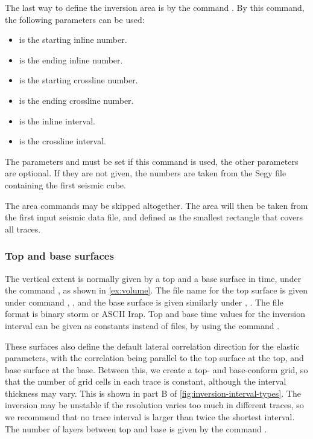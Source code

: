 The last way to define the inversion area is by the command . By this command, the following parameters can be used:
\begin{itemize}
\item {} is the starting inline number.
\item {} is the ending inline number.
\item {} is the starting crossline number.
\item {} is the ending crossline number.
\item {} is the inline interval.
\item {} is the crossline interval.
\end{itemize}
The parameters  and  must be set if this command is used, the other parameters are optional. If they are not given, the numbers are taken from the Segy file containing the first seismic cube.

The area commands may be skipped altogether. The area will then be taken from the first input seismic data file, and defined as the smallest rectangle that covers all traces.

\subsubsection{Top and base surfaces}
The vertical extent is normally given by a top and a base surface in
time, under the command 
, as shown in \autoref{ex:volume}. The
file name for the top surface is given under command
, , and the base
surface is given similarly under 
, . The file format is binary
storm or ASCII Irap. Top and base time values for the inversion
interval can be given as constants instead of files, by using the
command .   

These surfaces also define the default lateral correlation direction
for the elastic parameters, with the correlation being parallel to the
top surface at the top, and base surface at the base. Between this, we
create a top- and base-conform grid, so that the number of grid cells
in each trace is constant, although the interval thickness may
vary. This is shown in part B of
\autoref{fig:inversion-interval-types}. The inversion may be unstable
if the resolution varies too much in different traces, so we recommend
that no trace interval is larger than twice the shortest interval. The
number of layers between top and base is given by the command
 .

